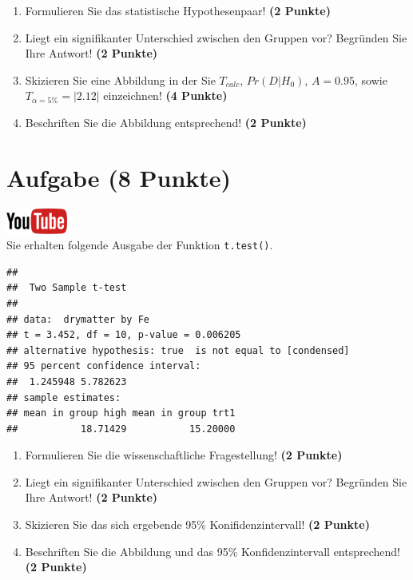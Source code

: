\documentclass[a4paper, 9pt]{scrartcl}\usepackage[]{graphicx}\usepackage[]{xcolor}
\makeatletter
\newenvironment{kframe}{%
 \def\at@end@of@kframe{}%
 \ifinner\ifhmode%
  \def\at@end@of@kframe{\end{minipage}}%
  \begin{minipage}{\columnwidth}%
 \fi\fi%
 \def\FrameCommand##1{\hskip\@totalleftmargin \hskip-\fboxsep
 \colorbox{shadecolor}{##1}\hskip-\fboxsep
     \hskip-\linewidth \hskip-\@totalleftmargin \hskip\columnwidth}%
 \MakeFramed {\advance\hsize-\width
   \@totalleftmargin\z@ \linewidth\hsize
   \@setminipage}}%
 {\par\unskip\endMakeFramed%
 \at@end@of@kframe}
\newenvironment{knitrout}{}{} %
\makeatother
\begin{document}
\begin{enumerate}
  \item Formulieren Sie das statistische Hypothesenpaar! \textbf{(2
Punkte)}
\item Liegt ein signifikanter Unterschied zwischen den Gruppen vor?
  Begr{\"u}nden Sie Ihre Antwort! \textbf{(2 Punkte)}
\item Skizieren Sie eine Abbildung in der Sie $T_{calc}$, $Pr(D|H_0)$, $A=0.95$,
  sowie $T_{\alpha=5\%} = |2.12|$ einzeichnen! \textbf{(4 Punkte)}
\item Beschriften Sie die Abbildung entsprechend! \textbf{(2 Punkte)}  
\end{enumerate} 
\clearpage

\section{Aufgabe \hfill (8 Punkte)}

\hfill\href{https://youtu.be/wJqsNV1hOW8}{\includegraphics[width =
  2cm]{img/youtube}}\\[1Ex]

Sie erhalten folgende \Rlogo Ausgabe der Funktion \texttt{t.test()}.

\begin{knitrout}
\color{fgcolor}\begin{kframe}
\begin{verbatim}
## 
## 	Two Sample t-test
## 
## data:  drymatter by Fe
## t = 3.452, df = 10, p-value = 0.006205
## alternative hypothesis: true  is not equal to [condensed]
## 95 percent confidence interval:
##  1.245948 5.782623
## sample estimates:
## mean in group high mean in group trt1 
##           18.71429           15.20000
\end{verbatim}
\end{kframe}
\end{knitrout}


\begin{enumerate}
  \item Formulieren Sie die wissenschaftliche Fragestellung! \textbf{(2
Punkte)}
\item Liegt ein signifikanter Unterschied zwischen den Gruppen vor?
  Begr{\"u}nden Sie Ihre Antwort! \textbf{(2 Punkte)}
\item Skizieren Sie das sich ergebende 95\% Konifidenzintervall! \textbf{(2 Punkte)}
\item Beschriften Sie die Abbildung und
  das 95\% Konfidenzintervall entsprechend! \textbf{(2 Punkte)}  
\end{enumerate} 
\clearpage
\end{document}
